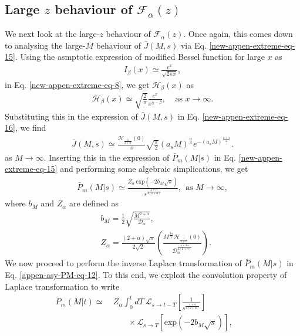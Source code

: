 \documentclass[superscriptaddress,amsmath,amssymb,aps,onecolumn]{revtex4}
\begin{document}
\subsection{Large $z$ behaviour of $\mathcal{F}_{\alpha}(z)$}
We next look at the large-$z$ behaviour of $\mathcal{F}_{\alpha}(z)$. Once again, this comes down to analysing the large-$M$ behaviour of $\bar{J}(M,s)$ via Eq. \eqref{new-appen-extreme-eq-15}. Using the asmptotic expression of modified Bessel function for large $x$ as
\begin{align}
I_{\beta}(x) \simeq \frac{e^{x}}{\sqrt{2 \pi x}},
\label{appen-asy-PM-eq-9}
\end{align}
in Eq. \eqref{new-appen-extreme-eq-8}, we get $\mathcal{H}_{\beta}(x)$ as 
\begin{align}
\mathcal{H}_{\beta}(x) \simeq \sqrt{\frac{2}{\pi}} \frac{e^x}{x^{\frac{1}{2}-\beta}},~~~~~ \text{as }x \to \infty.
\label{appen-asy-PM-eq-10}
\end{align}
Substituting this in the expression of $\bar{J}(M,s)$ in Eq. \eqref{new-appen-extreme-eq-16}, we find 
\begin{align}
\bar{J}(M,s) \simeq \frac{\mathcal{H}_{\frac{1}{2+\alpha}}(0)}{s} \sqrt{\frac{\pi}{2}} \left( a_s M\right)^{\frac{\alpha}{4}} e^{-\left( a_s M\right)^{\frac{2+\alpha}{2}}}.
\label{appen-asy-PM-eq-11}
\end{align}
as $M \to \infty$. Inserting this in the expression of $\bar{P}_m(M|s)$ in Eq. \eqref{new-appen-extreme-eq-15} and performing some algebraic simplications, we get
\begin{align}
\bar{P}_m(M|s) \simeq \frac{Z_{\alpha}~\text{exp} \left( -2b_M \sqrt{s} \right)}{s^{\frac{4+\alpha}{4(2+\alpha)}}} ,~~\text{as }M \to \infty,
\label{appen-asy-PM-eq-12}
\end{align}
where $b_M$ and $Z_{\alpha}$ are defined as
\begin{align}
& b_M = \frac{1}{2}\sqrt{\frac{M^{2+\alpha}}{\mathcal{D}_{\alpha}}}, \label{appen-asy-PM-eq-13} \\
& Z_{\alpha} = \frac{(2+\alpha)\sqrt{\pi}}{2\sqrt{2}} \left(  \frac{M^{\frac{3 \alpha}{4}}\mathcal{H}_{\frac{1}{2+\alpha}}(0)}{\mathcal{D}_{\alpha}^{\frac{4+3\alpha}{4(2+\alpha)}}}\right).\label{appen-asy-PM-eq-14}
\end{align}
We now proceed to perform the inverse Laplace transformation of $\bar{P}_m(M|s)$ in Eq. \eqref{appen-asy-PM-eq-12}. To this end, we exploit the convolution property of Laplace transformation to write
\begin{align}
P_m(M|t) \simeq &  ~Z_{\alpha} \int _{0}^{t} dT ~\mathcal{L}_{s \to t- T} \left[\frac{1}{s^{\frac{4+\alpha}{4(2+\alpha)}}} \right] ~~~~~~~~~~~~~~~~~~~~~~~~\nonumber \\
& ~~~~~~~~~ \times \mathcal{L}_{s \to T} \left[ \text{exp} \left( -2b_M \sqrt{s} \right) \right],
\label{appen-asy-PM-eq-15}
\end{align} 
\end{document}
